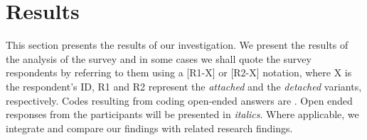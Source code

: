 \begin{figure}[t!]
\centering
\vspace{-.3cm}
    \hfill
    \hfill
    \hfill
    \caption{\rqOne}
     \label{fig:original_common}
     \vspace{-.3cm}
\end{figure}

\section{Results}
\label{sec:results}


This section presents the results of our investigation.
We present the results of the analysis of the survey and in some cases we shall quote the survey respondents by referring to them using a [R1-X] or [R2-X]
notation, where X is the respondent’s ID, R1 and R2 represent the \textit{attached} and the \textit{detached} variants, respectively. Codes resulting from coding open-ended answers are .
Open ended responses from the participants will be presented in \emph{italics}.
Where applicable, we integrate and compare our findings with related research findings. 


